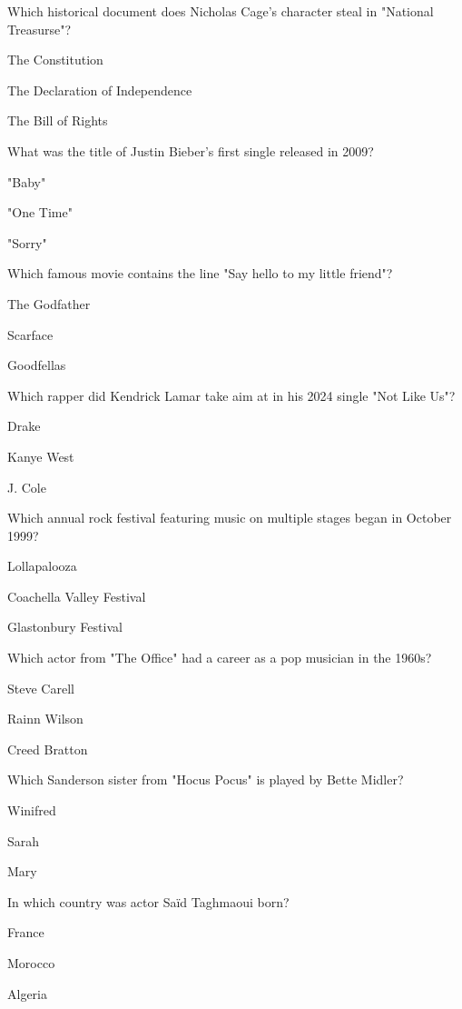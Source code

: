 \begin{enhancedmcq}{Which historical document does Nicholas Cage's character steal in "National Treasurse"?}
\item The Constitution
\item The Declaration of Independence
\item The Bill of Rights

\end{enhancedmcq}
\begin{enhancedmcq}{What was the title of Justin Bieber's first single released in 2009?}
\item "Baby"
\item "One Time"
\item "Sorry"

\end{enhancedmcq}
\begin{enhancedmcq}{Which famous movie contains the line "Say hello to my little friend"?}
\item The Godfather
\item Scarface
\item Goodfellas

\end{enhancedmcq}
\begin{enhancedmcq}{Which rapper did Kendrick Lamar take aim at in his 2024 single "Not Like Us"?}
\item Drake
\item Kanye West
\item J. Cole

\end{enhancedmcq}
\begin{enhancedmcq}{Which annual rock festival featuring music on multiple stages began in October 1999?}
\item Lollapalooza
\item Coachella Valley Festival
\item Glastonbury Festival

\end{enhancedmcq}
\begin{enhancedmcq}{Which actor from "The Office" had a career as a pop musician in the 1960s?}
\item Steve Carell
\item Rainn Wilson
\item Creed Bratton

\end{enhancedmcq}
\begin{enhancedmcq}{Which Sanderson sister from "Hocus Pocus" is played by Bette Midler?}
\item Winifred
\item Sarah
\item Mary

\end{enhancedmcq}
\begin{enhancedmcq}{In which country was actor Saïd Taghmaoui born?}
\item France
\item Morocco
\item Algeria
\end{enhancedmcq}